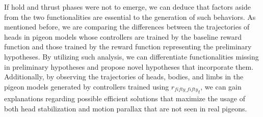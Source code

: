     If hold and thrust phases were not to emerge, we can deduce that factors aside from the two functionalities are essential to the generation of such behaviors.
    As mentioned before, we are comparing the differences between the trajectories of heads in pigeon models whose controllers are trained by the baseline reward function and those trained by the reward function representing the preliminary hypotheses.
    By utilizing such analysis, we can differentiate functionalities missing in preliminary hypotheses and propose novel hypotheses that incorporate them.
    Additionally, by observing the trajectories of heads, bodies, and limbs in the pigeon models generated by controllers trained using ${r_{fifty\_fifty}}_t$, we can gain explanations regarding possible efficient solutions that maximize the usage of both head stabilization and motion parallax that are not seen in real pigeons.
